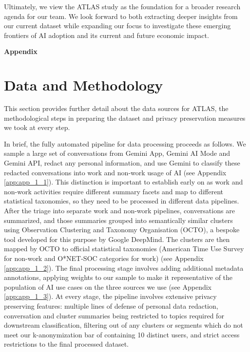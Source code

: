 \documentclass[11pt,a4paper]{article}
\begin{document}
Ultimately, we view the ATLAS study as the foundation for a broader research agenda for our team. We look forward to both extracting deeper insights from our current dataset while expanding our focus to investigate these emerging frontiers of AI adoption and its current and future economic impact.

\newpage





\newpage
\appendix
\textbf{\Huge Appendix}

\section{Data and Methodology}
\label{app:app1}

This section provides further detail about the data sources for ATLAS, the methodological steps in preparing the dataset and privacy preservation measures we took at every step.

In brief, the fully automated pipeline for data processing proceeds as follows. We sample a large set of conversations from Gemini App, Gemini AI Mode and Gemini API, redact any personal information, and use Gemini to classify these redacted conversations into work and non-work usage of AI (see Appendix \ref{app:app_1_1}). This distinction is important to establish early on as work and non-work activities require different summary facets and map to different statistical taxonomies, so they need to be processed in different data pipelines. After the triage into separate work and non-work pipelines, conversations are summarized, and those summaries grouped into semantically similar clusters using Observation Clustering and Taxonomy Organisation (OCTO), a bespoke tool developed for this purpose by Google DeepMind. The clusters are then mapped by OCTO to official statistical taxonomies (American Time Use Survey for non-work and O*NET-SOC categories for work) (see Appendix \ref{app:app_1_2}). The final processing stage involves adding additional metadata annotations, applying weights to our sample to make it representative of the population of AI use cases on the three sources we use (see Appendix \ref{app:app_1_3}). At every stage, the pipeline involves extensive privacy preserving features: multiple lines of defense of personal data redaction, conversation and cluster summaries being restricted to topics required for downstream classification, filtering out of any clusters or segments which do not meet our k-anonymization bar of containing 10 distinct users, and strict access restrictions to the final processed dataset.
\end{document}
